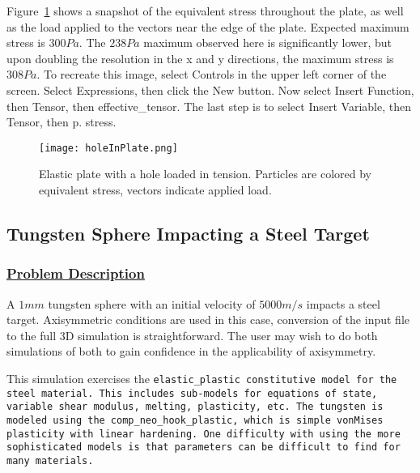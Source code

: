 Figure~\ref{fig:holeInPlate} shows a snapshot of the equivalent stress
throughout the plate, as well as the load applied to the vectors near the
edge of the plate.  Expected maximum stress is $300 Pa$.  The $238 Pa$ maximum
observed here is significantly lower, but upon doubling the resolution in the
x and y directions, the maximum stress is $308 Pa$.  To recreate this image, select
Controls in the upper left corner of the screen.  Select Expressions, then click the New 
button.  Now select Insert Function, then Tensor, then effective\_tensor.  The last step is
to select Insert Variable, then Tensor, then p. stress.  
\begin{figure}
  \center
  \texttt{[image: holeInPlate.png]}
  \caption{Elastic plate with a hole loaded in tension.  Particles are
           colored by equivalent stress, vectors indicate applied load.}
  \label{fig:holeInPlate}
\end{figure}
\newpage

\subsection*{\center Tungsten Sphere Impacting a Steel Target}
\subsubsection*{\underline{Problem Description}}
A $1 mm$ tungsten sphere with an initial velocity of $5000 m/s$
impacts a steel target.  Axisymmetric conditions are used in this case,
conversion of the input file to the full 3D simulation is straightforward.
The user may wish to do both simulations of both to gain confidence in the
applicability of axisymmetry. 

This simulation exercises the \tt elastic\_plastic \normalfont
constitutive model for the
steel material. This includes sub-models for equations of state,
variable shear modulus, melting, plasticity, etc.  The tungsten is modeled
using the \tt comp\_neo\_hook\_plastic, \normalfont which is simple vonMises
plasticity with linear hardening.  One difficulty with using the more 
sophisticated models is that parameters can be difficult to find for many
materials.

